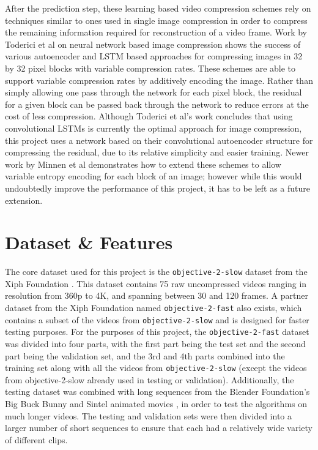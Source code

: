 \documentclass[10pt,twocolumn,letterpaper]{article}
\begin{document}
After the prediction step, these learning based video compression schemes rely on techniques similar to ones used in single image compression in order to compress the remaining information required for reconstruction of a video frame. Work by Toderici et al \cite{DBLP:journals/corr/TodericiVJHMSC16}\cite{DBLP:journals/corr/TodericiOHVMBCS15} on neural network based image compression shows the success of various autoencoder and LSTM based approaches for compressing images in 32 by 32 pixel blocks with variable compression rates. These schemes are able to support variable compression rates by additively encoding the image. Rather than simply allowing one pass through the network for each pixel block, the residual for a given block can be passed back through the network to reduce errors at the cost of less compression. Although Toderici et al's work concludes that using convolutional LSTMs is currently the optimal approach for image compression, this project uses a network based on their convolutional autoencoder structure for compressing the residual, due to its relative simplicity and easier training. Newer work by Minnen et al \cite{Minnen} demonstrates how to extend these schemes to allow variable entropy encoding for each block of an image; however while this would undoubtedly improve the performance of this project, it has to be left as a future extension.

\section{Dataset \& Features}
The core dataset used for this project is the \texttt{objective-2-slow} dataset from the Xiph Foundation \cite{xiph}. This dataset contains 75 raw uncompressed videos ranging in resolution from 360p to 4K, and spanning between 30 and 120 frames. A partner dataset from the Xiph Foundation named \texttt{objective-2-fast} also exists, which contains a subset of the videos from \texttt{objective-2-slow} and is designed for faster testing purposes. For the purposes of this project, the \texttt{objective-2-fast} dataset was divided into four parts, with the first part being the test set and the second part being the validation set, and the 3rd and 4th parts combined into the training set along with all the videos from \texttt{objective-2-slow} (except the videos from objective-2-slow already used in testing or validation). Additionally, the testing dataset was combined with long sequences from the Blender Foundation's Big Buck Bunny and Sintel animated movies \cite{blender}, in order to test the algorithms on much longer videos. The testing and validation sets were then divided into a larger number of short sequences to ensure that each had a relatively wide variety of different clips.
\end{document}
